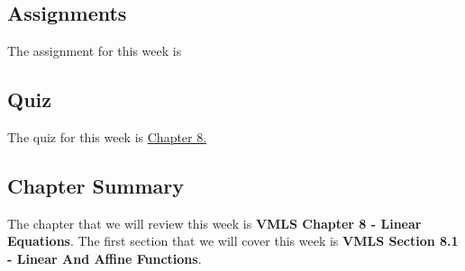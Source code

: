 \subsection{Assignments}

The assignment for this week is   

\subsection{Quiz}

The quiz for this week is \href{https://applied.cs.colorado.edu/mod/quiz/view.php?id=50764}{Chapter 8.}  

\subsection{Chapter Summary}

The chapter that we will review this week is \textbf{VMLS Chapter 8 - Linear Equations}. The first section that we will cover this week is \textbf{VMLS Section 8.1 - Linear And Affine Functions}.

